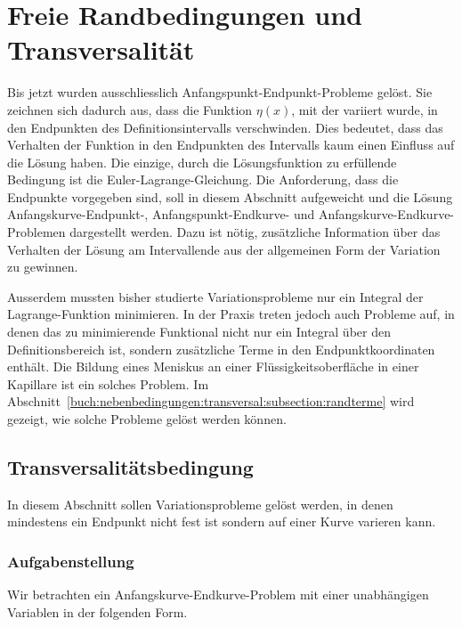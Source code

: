 %
%
%
\section{Freie Randbedingungen und Transversalität
\label{buch:nebenbedingungen:section:transversal}}
Bis jetzt wurden ausschliesslich Anfangspunkt-Endpunkt-Probleme gelöst.
Sie zeichnen sich dadurch aus, dass die Funktion $\eta(x)$, mit der
variiert wurde, in den Endpunkten des Definitionsintervalls
verschwinden.
Dies bedeutet, dass das Verhalten der Funktion in den Endpunkten des
Intervalls kaum einen Einfluss auf die Lösung haben.
Die einzige, durch die Lösungsfunktion zu erfüllende Bedingung ist die
Euler-Lagrange-Gleichung.
Die Anforderung, dass die Endpunkte vorgegeben sind, soll in diesem
Abschnitt aufgeweicht und die Lösung Anfangskurve-Endpunkt-,
Anfangspunkt-Endkurve- und Anfangskurve-Endkurve-Problemen dargestellt
werden.
Dazu ist nötig, zusätzliche Information über das Verhalten der Lösung
am Intervallende aus der allgemeinen Form der Variation zu gewinnen.

Ausserdem mussten bisher studierte Variationsprobleme nur ein 
Integral der Lagrange-Funktion minimieren.
In der Praxis treten jedoch auch Probleme auf, in denen das zu
minimierende Funktional nicht nur ein Integral über den Definitionsbereich
ist, sondern zusätzliche Terme in den Endpunktkoordinaten enthält.
Die Bildung eines Meniskus an einer Flüssigkeitsoberfläche in einer 
Kapillare ist ein solches Problem.
Im Abschnitt~\ref{buch:nebenbedingungen:transversal:subsection:randterme}
wird gezeigt, wie solche Probleme gelöst werden können.

%
%
\subsection{Transversalitätsbedingung
\label{buch:nebenbedingungen:transversal:subsection:transversalitaetsbedingung}}
In diesem Abschnitt sollen Variationsprobleme gelöst werden, in denen
mindestens ein Endpunkt nicht fest ist sondern auf einer Kurve
varieren kann.

%
%
\subsubsection{Aufgabenstellung}
Wir betrachten ein Anfangskurve-Endkurve-Problem mit einer unabhängigen
Variablen in der folgenden Form.

